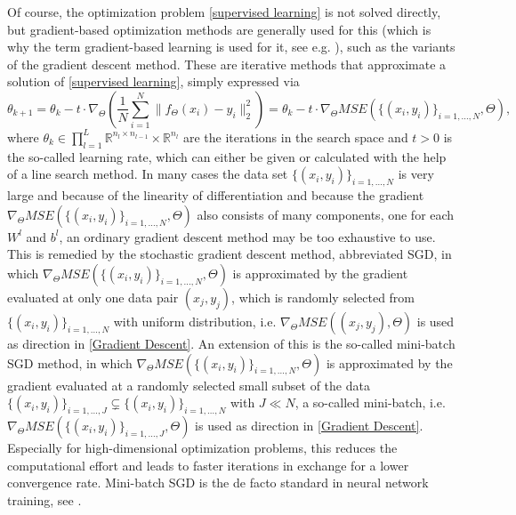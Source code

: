 Of course, the optimization problem \cref{supervised learning} is not solved directly, but gradient-based optimization methods are generally used for this (which is why the term gradient-based learning is used for it, see e.g. \cite[p.~177]{GoodfellowBengioCourville:2016}), such as the variants of the gradient descent method. These are iterative methods that approximate a solution of \cref{supervised learning}, simply expressed via 
\begin{equation}
    \label{Gradient Descent}
    \theta_{k+1} = \theta_k - t \cdot \nabla_{\Theta} \left( \frac{1}{N}\sum_{i=1}^{N} \lVert f_{\Theta} \left(x_{i}\right) - y_{i}\rVert^{2}_2 \right) = \theta_k - t \cdot \nabla_{\Theta} MSE(\{ (x_i, y_i) \}_{i = 1, \ldots, N}, \Theta),
\end{equation}
where $\theta_k \in \prod^L_{l=1}  \mathbb{R}^{n_l \times n_{l-1}} \times \mathbb{R}^{n_l}$ are the iterations in the search space and $t > 0$ is the so-called learning rate, which can either be given or calculated with the help of a line search method. In many cases the data set $\{ (x_i, y_i) \}_{i = 1, \ldots, N}$ is very large and because of the linearity of differentiation and because the gradient $\nabla_{\Theta} MSE(\{ (x_i, y_i) \}_{i = 1, \ldots, N}, \Theta)$ also consists of many components, one for each $W^l$ and $b^l$, an ordinary gradient descent method may be too exhaustive to use. This is remedied by the stochastic gradient descent method, abbreviated SGD, in which $\nabla_{\Theta} MSE(\{ (x_i, y_i) \}_{i = 1, \ldots, N}, \Theta)$ is approximated by the gradient evaluated at only one data pair $(x_j, y_j)$, which is randomly selected from $\{ (x_i, y_i) \}_{i = 1, \ldots, N}$ with uniform distribution, i.e. $\nabla_{\Theta} MSE((x_j, y_j), \Theta)$ is used as direction in \cref{Gradient Descent}. An extension of this is the so-called mini-batch SGD method, in which $\nabla_{\Theta} MSE(\{ (x_i, y_i) \}_{i = 1, \ldots, N}, \Theta)$ is approximated by the gradient evaluated at a randomly selected small subset  of the data $\{ (x_i, y_i) \}_{i = 1, \ldots, J} \subsetneq  \{ (x_i, y_i) \}_{i = 1, \ldots, N}$ with $J \ll N$, a so-called mini-batch, i.e. $\nabla_{\Theta} MSE(\{ (x_i, y_i) \}_{i = 1, \ldots, J}, \Theta)$ is used as direction in \cref{Gradient Descent}. Especially for high-dimensional optimization problems, this reduces the computational effort and leads to faster iterations in exchange for a lower convergence rate. Mini-batch SGD is the de facto standard in neural network training, see \cite[sections~5.9~+~8.3.1]{GoodfellowBengioCourville:2016}. \\
